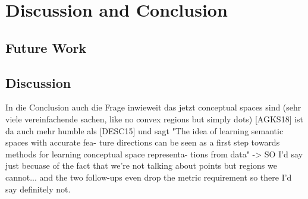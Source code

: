 
\chapter{Discussion and Conclusion}

\section{Future Work}




\section{Discussion}



In die Conclusion auch die Frage inwieweit das jetzt conceptual spaces sind (sehr viele vereinfachende sachen, like no convex regions but simply dots)
[AGKS18] ist da auch mehr humble als [DESC15] und sagt "The idea of learning semantic spaces with accurate fea- ture directions can be seen as a first step towards methods for learning conceptual space representa- tions from data"
-> SO I'd say just becuase of the fact that we're not talking about points but regions we cannot... and the two follow-ups even drop the metric requirement so there I'd say definitely not.




